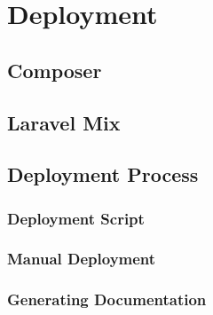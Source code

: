 \chapter{Deployment}

\section{Composer}

\section{Laravel Mix}

\section{Deployment Process}

\subsection{Deployment Script}

\subsection{Manual Deployment}

\subsection{Generating Documentation}